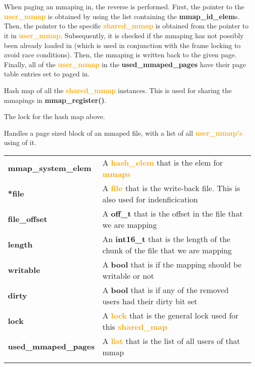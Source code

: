 \documentclass{report}
\newcommand{\fun}[1]{\textcolor{Emerald}{\textbf{#1}}}
\newcommand{\file}[1]{\textcolor{YellowGreen}{\textbf{#1}}}
\newcommand{\struct}[1]{\textcolor{orange}{\textbf{#1}}}
\newcommand{\var}[1]{\textcolor{RoyalPurple}{\textbf{#1}}}
\newcommand{\const}[1]{\textcolor{BrickRed}{\textbf{#1}}}
\newcommand{\pintoscode}[4]{}
\newcommand{\pintosfile}[3]{\pintoscode{#1}{#2}{\file{#3}}{#3}}
\begin{document}
				\\
				\\ When paging an mmaping in, the reverse is performed.
				First, the pointer to the \struct{user\_mmap} is obtained
				by using the list containing the \var{mmap\_id\_elem}s. Then, the pointer to the specific \struct{shared\_mmap}
				is obtained from the pointer to it in \struct{user\_mmap}. Subsequently, it is checked if
				the mmaping has not possibly been already loaded in (which is used in conjunction with the frame locking to avoid race conditions).
				Then, the mmaping is written back to the given page. Finally, all of the \struct{user\_mmap} in the \var{used\_mmaped\_pages} have
				their page table entries set to paged in.
				
				\pintosfile{37}{37}{mmap.c}
				Hash map of all the \struct{shared\_mmap} instances. This is used for 
				sharing the mmapings in \fun{mmap\_register()}.

				\pintosfile{40}{40}{mmap.c} 
				The lock for the hash map above.
				
				\pintosfile{45}{57}{mmap.c}
				Handles a page sized block of an mmaped file, with a list of all 
				\struct{user\_mmap's} using of it. \\
				\begin{center}
					\begin{tabular}{l p{10cm}}
							\vspace*{2mm}
							\var{mmap\_system\_elem}  & A \struct{hash\_elem} that is the elem for \struct{mmaps} \\ \vspace*{2mm}
							\var{*file}               & A \struct{file} that is the write-back file. This is also used for indenficication \\ \vspace*{2mm}
							\var{file\_offset}        & A \const{off\_t} that is the offset in the file that we are mapping \\ \vspace*{2mm}
							\var{length}              & An \const{int16\_t} that is the length of the chunk of the file that we are mapping \\ \vspace*{2mm}
							\var{writable}            & A \const{bool} that is if the mapping should be writable or not \\ \vspace*{2mm}
							\var{dirty}               & A \const{bool} that is if any of the removed users had their dirty bit set \\ \vspace*{2mm}
							\var{lock}                & A \struct{lock} that is the general lock used for this \struct{shared\_map}\\ \vspace*{2mm}
							\var{used\_mmaped\_pages} & A \struct{list} that is the list of all users of that mmap \\ \vspace*{2mm}
					\end{tabular}
				\end{center}
				
\end{document}
